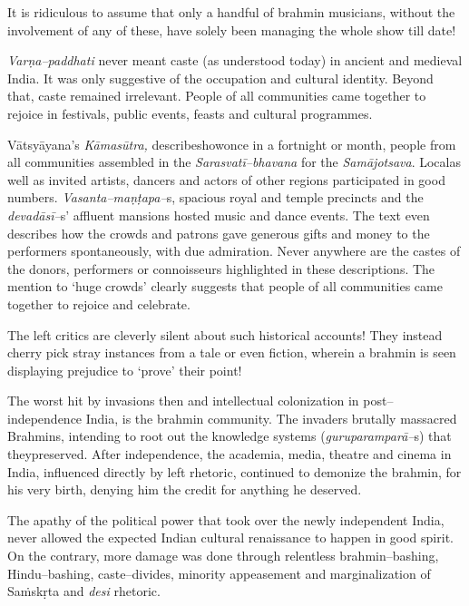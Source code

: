 It is ridiculous to assume that only a handful of brahmin musicians, without the involvement of any of these, have solely been managing the whole show till date!

\textit{Varṇa–paddhati} never meant caste (as understood today) in ancient and medieval India. It was only suggestive of the occupation and cultural identity. Beyond that, caste remained irrelevant. People of all communities came together to rejoice in festivals, public events, feasts and cultural programmes.

Vātsyāyana’s \textit{Kāmasūtra,} describeshowonce in a fortnight or month, people from all communities assembled in the \textit{Sarasvatī–bhavana} for the \textit{Samājotsava}. Localas well as invited artists, dancers and actors of other regions participated in good numbers. \textit{Vasanta–maṇṭapa–}s, spacious royal and temple precincts and the \textit{devadāsī–}s’ affluent mansions hosted music and dance events. The text even describes how the crowds and patrons gave generous gifts and money to the performers spontaneously, with due admiration. Never anywhere are the castes of the donors, performers or connoisseurs highlighted in these descriptions. The mention to ‘huge crowds’ clearly suggests that people of all communities came together to rejoice and celebrate.

The left critics are cleverly silent about such historical accounts! They instead cherry pick stray instances from a tale or even fiction, wherein a brahmin is seen displaying prejudice to ‘prove’ their point!

The worst hit by invasions then and intellectual colonization in post–independence India, is the brahmin community. The invaders brutally massacred Brahmins, intending to root out the knowledge systems (\textit{guru}\textit{paramparā–}s) that theypreserved. After independence, the academia, media, theatre and cinema in India, influenced directly by left rhetoric, continued to demonize the brahmin, for his very birth, denying him the credit for anything he deserved.

The apathy of the political power that took over the newly independent India, never allowed the expected Indian cultural renaissance to happen in good spirit. On the contrary, more damage was done through relentless brahmin–bashing, Hindu–bashing, caste–divides, minority appeasement and marginalization of Saṁskṛta and \textit{desi} rhetoric.


